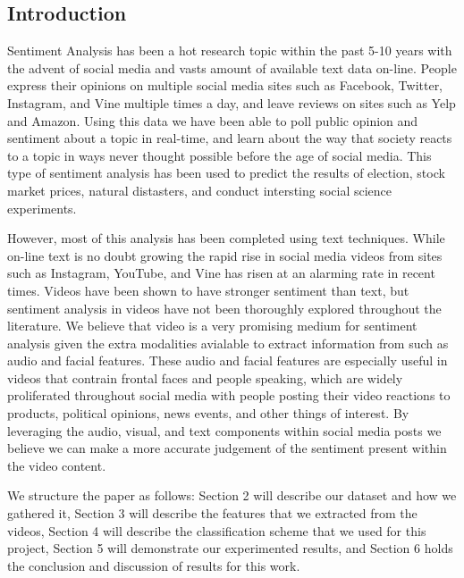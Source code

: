 \documentclass[twoside]{article}
\begin{document}
\begin{multicols}{2} %

\section{Introduction}
Sentiment Analysis has been a hot research topic within the past 5-10 years with the advent of social media and vasts amount of available text data on-line.
People express their opinions on multiple social media sites such as Facebook, Twitter, Instagram, and Vine multiple times a day, and leave reviews on sites such as Yelp and Amazon.
Using this data we have been able to poll public opinion and sentiment about a topic in real-time, and learn about the way that society reacts to a topic in ways never thought possible before the age of social media.
This type of sentiment analysis has been used to predict the results of election, stock market prices, natural distasters, and conduct intersting social science experiments.

However, most of this analysis has been completed using text techniques.  
While on-line text is no doubt growing the rapid rise in social media videos from sites such as Instagram, YouTube, and Vine has risen at an alarming rate in recent times.
Videos have been shown to have stronger sentiment than text, but sentiment analysis in videos have not been thoroughly explored throughout the literature.
We believe that video is a very promising medium for sentiment analysis given the extra modalities avialable to extract information from such as audio and facial features.
These audio and facial features are especially useful in videos that contrain frontal faces and people speaking, which are widely proliferated throughout social media with people posting their video reactions to products, political opinions, news events, and other things of interest.
By leveraging the audio, visual, and text components within social media posts we believe we can make a more accurate judgement of the sentiment present within the video content.

We structure the paper as follows: Section 2 will describe our dataset and how we gathered it, Section 3 will describe the features that we extracted from the videos, Section 4 will describe the classification scheme that we used for this project, Section 5 will demonstrate our experimented results, and Section 6 holds the conclusion and discussion of results for this work. 


\end{multicols}
\end{document}
